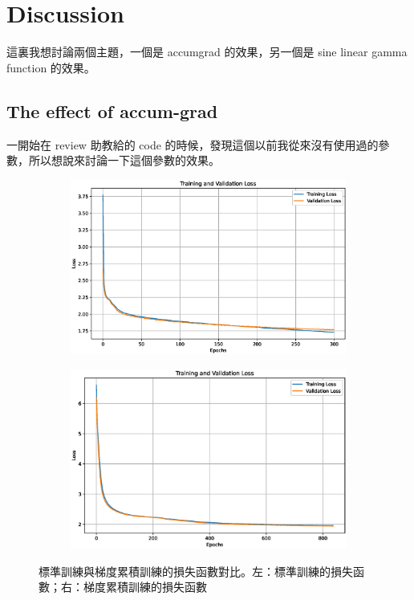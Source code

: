 \clearpage
\section{Discussion}

這裏我想討論兩個主題，一個是 accum\-grad 的效果，另一個是 sine linear gamma function 的效果。


\subsection{The effect of accum-grad}

一開始在 review 助教給的 code 的時候，發現這個以前我從來沒有使用過的參數，所以想說來討論一下這個參數的效果。 

\begin{figure}[h]
    \centering
    \begin{subfigure}{0.48\textwidth}
        \centering
        \includegraphics[width=\textwidth]{figures/loss_plot.eps}
        \label{fig:normal_loss_plot}
    \end{subfigure}
    \hfill
    \begin{subfigure}{0.48\textwidth}
        \centering
        \includegraphics[width=\textwidth]{figures/accum-grad_loss_plot.eps}
        \label{fig:accum-grad_loss_plot}
    \end{subfigure}
    \caption{標準訓練與梯度累積訓練的損失函數對比。左：標準訓練的損失函數；右：梯度累積訓練的損失函數}
    \label{fig:loss_comparison}
\end{figure}




